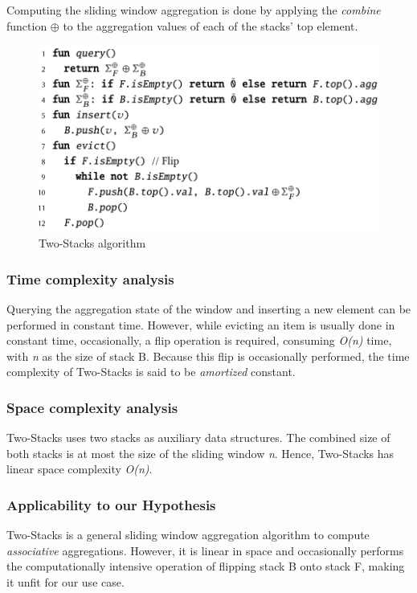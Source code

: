 Computing the sliding window aggregation is done by applying the \textit{combine} function $\oplus$ to the aggregation values of each of the stacks' top element. 

\begin{figure}[!htb]
    \begin{center}
      \includegraphics[scale=0.45]{figures/2-stacks.png}
      \caption{Two-Stacks algorithm}
      \label{fig:pseudo-2-stacks}
    \end{center}
\end{figure}

\subsubsection*{Time complexity analysis}
Querying the aggregation state of the window and inserting a new element can be performed in constant time. However, while evicting an item is usually done in constant time, occasionally, a flip operation is required, consuming \textit{O(n)} time, with \textit{n} as the size of stack B. Because this flip is occasionally performed, the time complexity of Two-Stacks is said to be \textit{amortized} constant.

\subsubsection*{Space complexity analysis}
Two-Stacks uses two stacks as auxiliary data structures. The combined size of both stacks is at most the size of the sliding window \textit{n}. Hence, Two-Stacks has linear space complexity \textit{O(n)}.

\subsubsection*{Applicability to our Hypothesis}
Two-Stacks is a general sliding window aggregation algorithm to compute \textit{associative} aggregations. However, it is linear in space and occasionally performs the computationally intensive operation of flipping stack B onto stack F, making it unfit for our use case.


